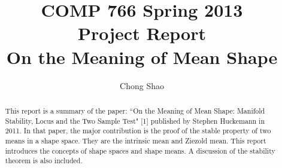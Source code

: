 \documentclass[12pt]{article}
\theoremstyle{definition}
\theoremstyle{remark}
\numberwithin{equation}{section}
\begin{document}
\title{
COMP 766 Spring 2013 \\ Project Report \\
On the Meaning of Mean Shape}%
\author{Chong Shao}%

\maketitle
\begin{abstract}
This report is a summary of the paper: ``On the Meaning of Mean Shape: Manifold Stability, Locus and the Two Sample Test" [1] published by Stephen Huckemann in 2011. In that paper, the major contribution is the proof of the stable property of two means in a shape space. They are the intrinsic mean and Ziezold mean. This report introduces the concepts of shape spaces and shape means. A discussion of the stability theorem is also included.
\end{abstract}
\end{document}
